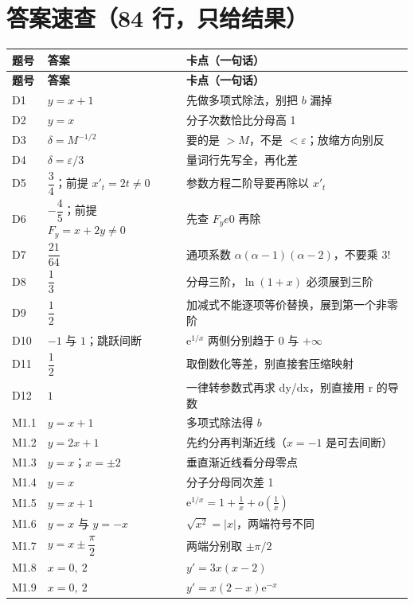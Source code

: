 \documentclass[11pt,a4paper]{ctexart}
\newcommand{\eps}{\varepsilon}
\newcommand{\ee}{\mathrm{e}}
\begin{document}
\section{答案速查（84 行，只给结果）}
{\footnotesize
\setlength{\tabcolsep}{2.5pt}
\renewcommand{\arraystretch}{1.0}
\begin{longtable}{@{}p{1.35cm}p{6.3cm}p{7.6cm}@{}}
\toprule
\textbf{题号} & \textbf{答案} & \textbf{卡点（一句话）} \\
\midrule
\endfirsthead
\toprule
\textbf{题号} & \textbf{答案} & \textbf{卡点（一句话）} \\
\midrule
\endhead
\bottomrule
\endlastfoot
D1 & $y=x+1$ & 先做多项式除法，别把 $b$ 漏掉 \\
D2 & $y=x$ & 分子次数恰比分母高 1 \\
D3 & $\delta=M^{-1/2}$ & 要的是 $>M$，不是 $<\varepsilon$；放缩方向别反 \\
D4 & $\delta=\eps/3$ & 量词行先写全，再化差 \\
D5 & $\dfrac34$；前提 $x\prime_t=2t\ne0$ & 参数方程二阶导要再除以 $x\prime_t$ \\
D6 & $-\dfrac45$；前提 $F_y=x+2y\ne0$ & 先查 $F_y
e0$ 再除 \\
D7 & $\dfrac{21}{64}$ & 通项系数 $\alpha(\alpha-1)(\alpha-2)$，不要乘 $3!$ \\
D8 & $\dfrac13$ & 分母三阶，$\ln(1+x)$ 必须展到三阶 \\
D9 & $\dfrac12$ & 加减式不能逐项等价替换，展到第一个非零阶 \\
D10 & $-1$ 与 $1$；跳跃间断 & $\ee^{1/x}$ 两侧分别趋于 $0$ 与 $+\infty$ \\
D11 & $\dfrac12$ & 取倒数化等差，别直接套压缩映射 \\
D12 & $1$ & 一律转参数式再求 dy/dx，别直接用 r 的导数 \\
M1.1 & $y=x+1$ & 多项式除法得 $b$ \\
M1.2 & $y=2x+1$ & 先约分再判渐近线（$x=-1$ 是可去间断） \\
M1.3 & $y=x$；$x=\pm2$ & 垂直渐近线看分母零点 \\
M1.4 & $y=x$ & 分子分母同次差 1 \\
M1.5 & $y=x+1$ & $\ee^{1/x}=1+\frac1x+o(\frac1x)$ \\
M1.6 & $y=x$ 与 $y=-x$ & $\sqrt{x^2}=|x|$，两端符号不同 \\
M1.7 & $y=x\pm\dfrac\pi2$ & 两端分别取 $\pm\pi/2$ \\
M1.8 & $x=0,\ 2$ & $y\prime=3x(x-2)$ \\
M1.9 & $x=0,\ 2$ & $y\prime=x(2-x)\ee^{-x}$ \\

\end{longtable}}
\end{document}
